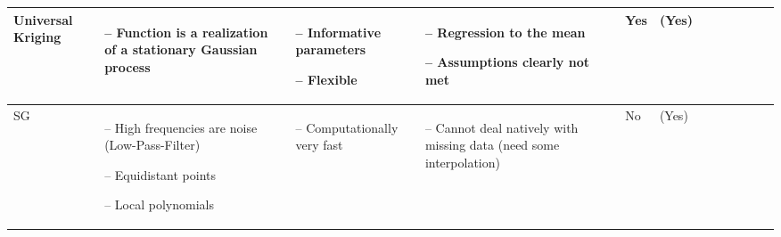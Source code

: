 \begin{table}[!ht]
\begin{tabular}{p{1.6cm}p{3.3cm}p{3.3cm}p{3.4cm}p{0.4cm}p{0.4cm}p{3cm}p{3cm}p{3cm}p{3cm}p{2.7cm}p{3cm}|}
		Universal Kriging                                                                                                                                            &
		\begin{cptitemize} \item[--]  Function is a realization of a stationary Gaussian process                                      \end{cptitemize}               &
		\begin{cptitemize} \item[--]  Informative parameters \item[--]  Flexible                                                             \end{cptitemize}        &
		\begin{cptitemize} \item[--]  Regression to the mean \item[--]  Assumptions clearly not met                                          \end{cptitemize}        &
		Yes                                                                                                                                                          &
		(Yes)                \\ \hline%

		SG                                                                                                                                        &
		\begin{cptitemize}
			\item[--]  High frequencies are noise (Low-Pass-Filter) \item[--]  Equidistant points \item[--]  Local polynomials\end{cptitemize}                                              &
		\begin{cptitemize} \item[--]  Computationally very fast                                                                   \end{cptitemize}                   &
		\begin{cptitemize} \item[--]  Cannot deal natively with missing data (need some interpolation)                              \end{cptitemize}                 &
		No                                                                                                                                                           &
		(Yes)                                                                                                                                                         \\ \hline%


\end{tabular}
\end{table}
